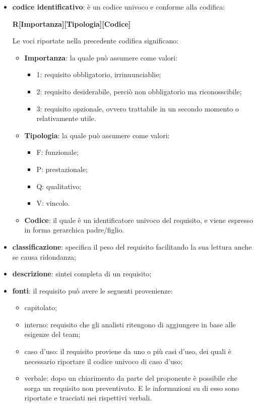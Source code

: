 				\begin{itemize}
					\item[] \textbf{codice identificativo}: è un codice univoco e conforme alla codifica: \newline \newline
					\centerline{\textbf{R[Importanza][Tipologia][Codice]}} \newline \newline
					Le voci riportate nella precedente codifica significano: 
					\begin{itemize}
						\item[] \textbf{Importanza}: la quale può assumere come valori:
						\begin{itemize}
							\item[] 1: requisito obbligatorio, irrinuunciablie;
							\item[] 2: requisito desiderabile, perciò non obbligatorio ma riconosscibile;
							\item[] 3: requisito opzionale, ovvero trattabile in un secondo momento o relativamente utile.
						\end{itemize}
						\item[] \textbf{Tipologia}: la quale può assumere come valori:
						\begin{itemize}
							\item[] F: funzionale;
							\item[] P: prestazionale;
							\item[] Q: qualitativo;
							\item[] V: vincolo.
						\end{itemize}
						\item[] \textbf{Codice}: il quale è un identificatore univoco del requisito, e viene espresso in forma gerarchica padre/figlio.
					\end{itemize}
					\item[] \textbf{classificazione}: specifica il peso del requisito facilitando la sua lettura anche se causa ridondanza;
					\item[] \textbf{descrizione}: sintei completa di un requisito;
					\item[] \textbf{fonti}: il requisito può avere le seguenti provenienze:
					\begin{itemize}
						\item[] capitolato;
						\item[] interno: requisito che gli analisti ritengono di aggiungere in base alle esigenze del team;
						\item[] caso d'uso: il requisito proviene da uno o più casi d'uso, dei quali è necessario riportare il codice univoco di caso d'uso;
						\item[] verbale: dopo un chiarimento da parte del proponente è possibile che sorga un requisito non preventivato. E le informazioni su di esso sono riportate e tracciati nei rispettivi verbali.
					\end{itemize}
				\end{itemize} \newline \newline
